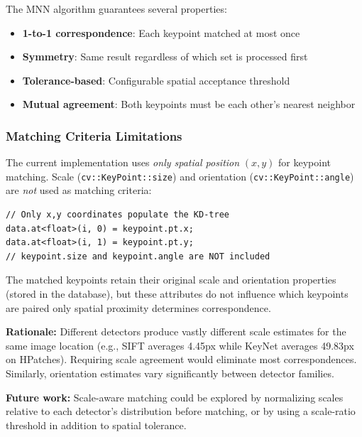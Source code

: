 The MNN algorithm guarantees several properties:

\begin{itemize}
    \item \textbf{1-to-1 correspondence}: Each keypoint matched at most once
    \item \textbf{Symmetry}: Same result regardless of which set is processed first
    \item \textbf{Tolerance-based}: Configurable spatial acceptance threshold
    \item \textbf{Mutual agreement}: Both keypoints must be each other's nearest neighbor
\end{itemize}

\subsubsection{Matching Criteria Limitations}

The current implementation uses \textit{only spatial position} $(x, y)$ for keypoint matching. Scale (\texttt{cv::KeyPoint::size}) and orientation (\texttt{cv::KeyPoint::angle}) are \textit{not} used as matching criteria:

\begin{verbatim}
// Only x,y coordinates populate the KD-tree
data.at<float>(i, 0) = keypoint.pt.x;
data.at<float>(i, 1) = keypoint.pt.y;
// keypoint.size and keypoint.angle are NOT included
\end{verbatim}

The matched keypoints retain their original scale and orientation properties (stored in the database), but these attributes do not influence which keypoints are paired only spatial proximity determines correspondence.

\textbf{Rationale:} Different detectors produce vastly different scale estimates for the same image location (e.g., SIFT averages 4.45px while KeyNet averages 49.83px on HPatches). Requiring scale agreement would eliminate most correspondences. Similarly, orientation estimates vary significantly between detector families.

\textbf{Future work:} Scale-aware matching could be explored by normalizing scales relative to each detector's distribution before matching, or by using a scale-ratio threshold in addition to spatial tolerance.

